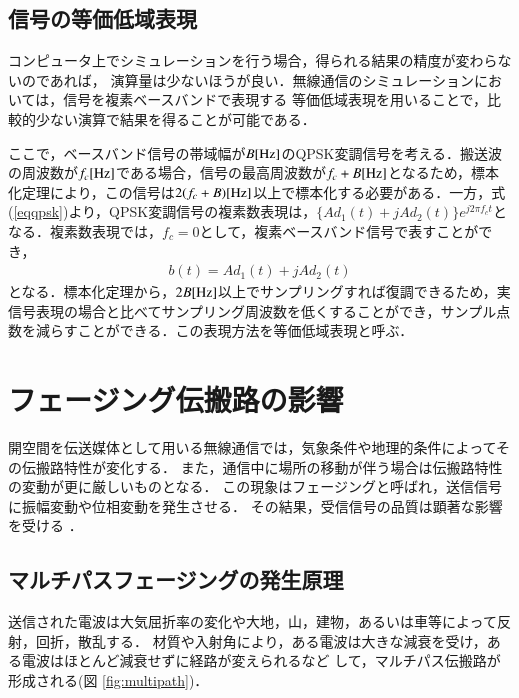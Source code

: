 \subsection{信号の等価低域表現}
コンピュータ上でシミュレーションを行う場合，得られる結果の精度が変わらないのであれば，
演算量は少ないほうが良い．無線通信のシミュレーションにおいては，信号を複素ベースバンドで表現する
等価低域表現を用いることで，比較的少ない演算で結果を得ることが可能である．

ここで，ベースバンド信号の帯域幅が$B[{\rm Hz}]$のQPSK変調信号を考える．搬送波の周波数が$f_c[{\rm Hz}]$である場合，信号の最高周波数が$f_c+B[{\rm Hz}]$となるため，標本化定理により，この信号は$2(f_c+B)[{\rm Hz}]$以上で標本化する必要がある．一方，式(\ref{eqqpsk})より，QPSK変調信号の複素数表現は，$\{Ad_1(t)+jAd_2(t)\}e^{j2\pi f_ct}$となる．複素数表現では，$f_c=0$として，複素ベースバンド信号で表すことができ，
\begin{eqnarray}
b(t)=Ad_1(t)+jAd_2(t)
\end{eqnarray}
となる．標本化定理から，$2B[{\rm Hz}]$以上でサンプリングすれば復調できるため，実信号表現の場合と比べてサンプリング周波数を低くすることができ，サンプル点数を減らすことができる．この表現方法を等価低域表現と呼ぶ\cite{takahata}．

\section{フェージング伝搬路の影響}
開空間を伝送媒体として用いる無線通信では，気象条件や地理的条件によってその伝搬路特性が変化する．
また，通信中に場所の移動が伴う場合は伝搬路特性の変動が更に厳しいものとなる．
この現象はフェージングと呼ばれ，送信信号に振幅変動や位相変動を発生させる．
その結果，受信信号の品質は顕著な影響を受ける \cite{saitou}．

\subsection{マルチパスフェージングの発生原理}
送信された電波は大気屈折率の変化や大地，山，建物，あるいは車等によって反射，回折，散乱する．
材質や入射角により，ある電波は大きな減衰を受け，ある電波はほとんど減衰せずに経路が変えられるなど
して，マルチパス伝搬路が形成される(図 \ref{fig:multipath})．

